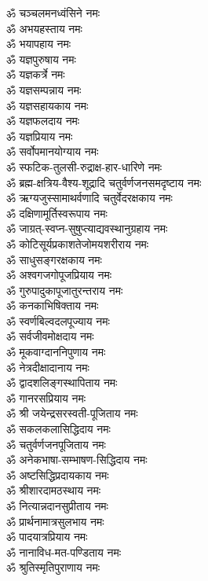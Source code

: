 \begin{flushleft}
\begin{multicols}{2}
ॐ चञ्चलमनध्वंसिने नमः\\
ॐ अभयहस्ताय नमः\\
ॐ भयापहाय नमः\\
ॐ यज्ञपुरुषाय नमः\hfill{}\\
ॐ यज्ञकर्त्रे नमः\\
ॐ यज्ञसम्पन्नाय नमः\\
ॐ यज्ञसहायकाय नमः\\
ॐ यज्ञफलदाय नमः\\
ॐ यज्ञप्रियाय नमः\\
ॐ सर्वोपमानयोग्याय नमः\\
ॐ स्फटिक-तुलसी-रुद्राक्ष-हार-धारिणे नमः\\
ॐ ब्रह्म-क्षत्रिय-वैश्य-शूद्रादि चतुर्वर्णजनसमदृष्टाय नमः\\
ॐ ऋग्यजुस्सामाथर्वणादि चतुर्वेदरक्षकाय नमः\\
ॐ दक्षिणामूर्तिस्वरूपाय नमः\hfill{}\\
ॐ जाग्रत्-स्वप्न-सुषुप्त्याद्यवस्थानुग्रहाय नमः\\
ॐ कोटिसूर्यप्रकाशतेजोमयशरीराय नमः\\
ॐ साधुसङ्गरक्षकाय नमः\\
ॐ अश्वगजगोपूजप्रियाय नमः\\
ॐ गुरुपादुकापूजातुरन्तराय नमः\\
ॐ कनकाभिषिक्ताय नमः\\
ॐ स्वर्णबिल्वदलपूज्याय नमः\\
ॐ सर्वजीवमोक्षदाय नमः\\
ॐ मूकवाग्दाननिपुणाय नमः\\
ॐ नेत्रदीक्षादानाय नमः\hfill{}\\
ॐ द्वादशलिङ्गस्थापिताय नमः\\
ॐ गानरसप्रियाय नमः\\
ॐ श्री जयेन्द्रसरस्वती-पूजिताय नमः\\
ॐ सकलकलासिद्धिदाय नमः\\
ॐ चतुर्वर्णजनपूजिताय नमः\\
ॐ अनेकभाषा-सम्भाषण-सिद्धिदाय नमः\\
ॐ अष्टसिद्धिप्रदायकाय नमः\\
ॐ श्रीशारदामठस्थाय नमः\\
ॐ नित्यान्नदानसुप्रीताय नमः\\
ॐ प्रार्थनामात्रसुलभाय नमः\hfill{}\\
ॐ पादयात्रप्रियाय नमः\\
ॐ नानाविध-मत-पण्डिताय नमः\\
ॐ श्रुतिस्मृतिपुराणाय नमः\\

\end{multicols}
\end{flushleft}
